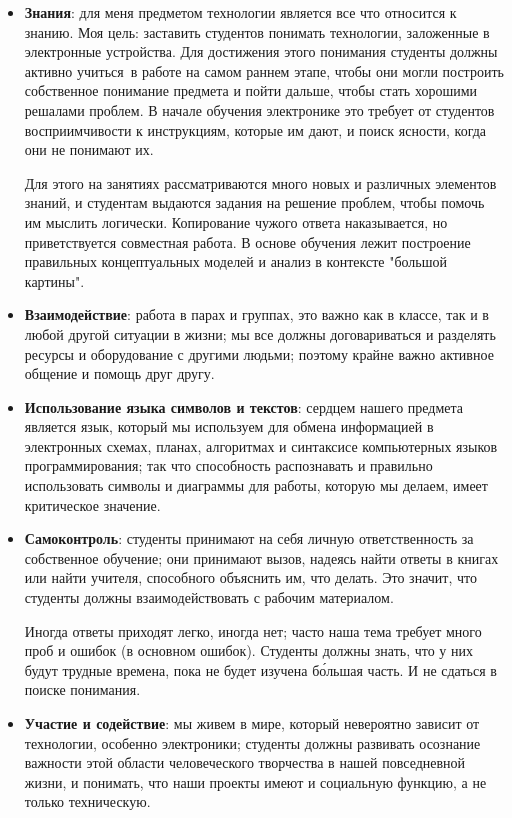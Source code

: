 
\begin{itemize}

\item\textbf{Знания}: для меня предметом технологии является все что относится к
знанию. Моя цель: заставить студентов понимать технологии, заложенные в
электронные устройства. Для достижения этого понимания студенты должны активно
учиться\
в работе на самом раннем этапе, чтобы они могли построить собственное понимание
предмета и пойти дальше, чтобы стать хорошими решалами проблем. В начале
обучения электронике это требует от студентов восприимчивости к инструкциям,
которые им дают, и поиск ясности, когда они не понимают их.

Для этого на занятиях рассматриваются много новых и различных элементов знаний,
и студентам выдаются задания на решение проблем, чтобы помочь им мыслить
логически. Копирование чужого ответа наказывается, но приветствуется совместная
работа. В основе обучения лежит построение правильных концептуальных моделей и
анализ в контексте "большой картины".

\item\textbf{Взаимодействие}: работа в парах и группах, это важно как в классе,
так и в любой другой ситуации в жизни; мы все должны договариваться и разделять
ресурсы и оборудование с другими людьми; поэтому крайне важно активное общение и
помощь друг другу.

\item\textbf{Использование языка символов и текстов}: сердцем нашего предмета
является язык, который мы используем для обмена информацией в электронных
схемах, планах, алгоритмах и синтаксисе компьютерных языков программирования;
так что способность распознавать и правильно использовать символы и диаграммы для
работы, которую мы делаем, имеет критическое значение.

\item\textbf{Самоконтроль}: студенты принимают на себя личную ответственность за
собственное обучение; они принимают вызов, надеясь найти ответы в книгах или
найти учителя, способного объяснить им, что делать. Это значит, что студенты
должны взаимодействовать с рабочим материалом. 

Иногда ответы приходят легко, иногда нет; часто наша тема требует много проб и
ошибок (в основном ошибок). Студенты должны знать, что у них будут трудные
времена, пока не будет изучена б\'{о}льшая часть. И не сдаться в поиске
понимания.

\item\textbf{Участие и содействие}: мы живем в мире, который невероятно зависит
от технологии, особенно электроники; студенты должны развивать осознание
важности этой области человеческого творчества в нашей повседневной жизни, и
понимать, что наши проекты имеют и социальную функцию, а не только техническую.

\end{itemize}

